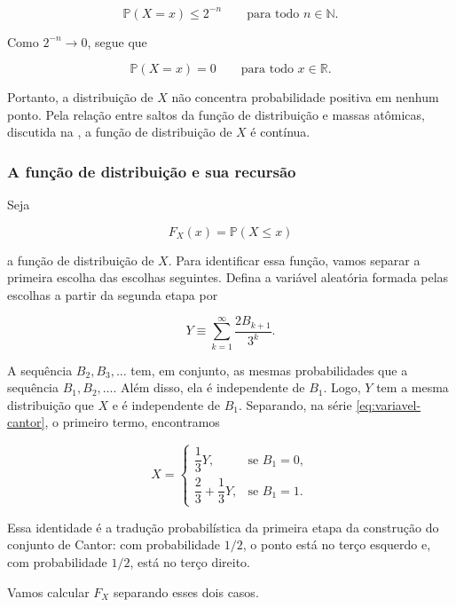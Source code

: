 \documentclass[12pt,portuguese]{article}
\theoremstyle{definition}
\theoremstyle{plainexercise}
\theoremstyle{starredexercise}
\theoremstyle{definition}
\begin{document}
\[
  \mathbb{P}(X=x)\leqslant 2^{-n}
  \qquad\text{para todo }n\in\mathbb{N}.
\]

Como $2^{-n}\to 0$, segue que

\begin{equation}\label{eq:distribuicao-cantor-sem-atomos}
  \mathbb{P}(X=x)=0
  \qquad\text{para todo }x\in\mathbb{R}.
\end{equation}

Portanto, a distribuição de $X$ não concentra probabilidade positiva em
nenhum ponto. Pela relação entre saltos da função de distribuição e massas
atômicas, discutida na , a função de
distribuição de $X$ é contínua.

\subsubsection{A função de distribuição e sua recursão}

Seja

\[
  F_X(x)=\mathbb{P}(X\leqslant x)
\]

a função de distribuição de $X$. Para identificar essa função, vamos separar a
primeira escolha das escolhas seguintes. Defina a variável aleatória formada
pelas escolhas a partir da segunda etapa por

\[
  Y\equiv\sum_{k=1}^{\infty}\frac{2B_{k+1}}{3^k}.
\]

A sequência $B_2,B_3,\ldots$ tem, em conjunto, as mesmas probabilidades que a
sequência $B_1,B_2,\ldots$. Além disso, ela é independente de $B_1$. Logo, $Y$
tem a mesma distribuição que $X$ e é independente de $B_1$. Separando, na série
\eqref{eq:variavel-cantor}, o primeiro termo, encontramos

\[
  X=
  \begin{cases}
    \dfrac{1}{3}Y, & \text{se }B_1=0,\\[0.5cm]
    \dfrac{2}{3}+\dfrac{1}{3}Y, & \text{se }B_1=1.
  \end{cases}
\]

Essa identidade é a tradução probabilística da primeira etapa da construção
do conjunto de Cantor: com probabilidade $1/2$, o ponto está no terço esquerdo
e, com probabilidade $1/2$, está no terço direito.

Vamos calcular $F_X$ separando esses dois casos.
\end{document}
